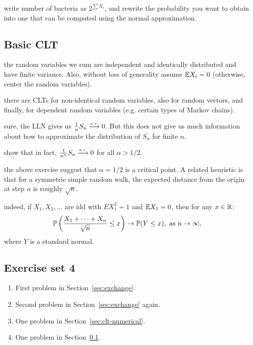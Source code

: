 \documentclass{article}
\begin{document}
 write number of bacteria as $2^{\sum X_i}$, and rewrite the probability you want to obtain into one that can be computed using the normal approximation.


\subsection{Basic CLT}\label{sec:basic-clt}

 the random variables we sum are independent and identically distributed and have finite variance. Also, without loss of generality assume $\E X_i = 0$ (otherwise, center the random variables).

 there are CLTs for non-identical random variables, also for random vectors, and finally, for dependent random variables (e.g. certain types of Markov chains). 

 sure, the LLN gives us $\frac{1}{n} S_n \ascv 0$. But this does not give us much information about how to approximate the distribution of $S_n$ for finite $n$.

 show that in fact, $\frac{1}{n^\alpha} S_n \ascv 0$ for all $\alpha > 1/2$. 

 the above exercise suggest that $\alpha = 1/2$ is a critical point. A related heuristic is that for a symmetric simple random walk, the expected distance from the origin at step $n$ is roughly $\sqrt{n}$.

 indeed, if $X_1, X_2, \dots$ are idd with $E X_1^2 = 1$ and $\E X_1 = 0$, then for any $x \in \R$:
\[ \P\left( \frac{X_1 + \dots + X_n}{\sqrt{n}} \le x\right) \to \P(Y \le x), \text{ as }n\to\infty, \]
where $Y$ is a standard normal.

\subsection{Exercise set 4}

\begin{enumerate}	
	\item First problem in Section~\ref{sec:exchange}.
	\item Second problem in Section~\ref{sec:exchange} again.
	\item One problem in Section~\ref{sec:clt-numerical}.
	\item One problem in Section~\ref{sec:basic-clt}.
\end{enumerate}
\end{document}
